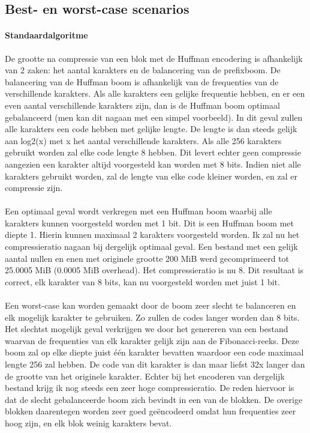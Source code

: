 \documentclass[11pt, a4paper]{article}
\begin{document}
\subsection{Best- en worst-case scenarios}
\paragraph{Standaardalgoritme}
De grootte na compressie van een blok met de Huffman encodering is afhankelijk van 2 zaken: het aantal karakters en de balancering van de prefixboom. De balancering van de Huffman boom is afhankelijk van de frequenties van de verschillende karakters. Als alle karakters een gelijke frequentie hebben, en er een even aantal verschillende karakters zijn, dan is de Huffman boom optimaal gebalanceerd (men kan dit nagaan met een simpel voorbeeld). In dit geval zullen alle karakters een code hebben met gelijke lengte. De lengte is dan steeds gelijk aan log2(x) met x het aantal verschillende karakters. Als alle 256 karakters gebruikt worden zal elke code lengte 8 hebben. Dit levert echter geen compressie aangezien een karakter altijd voorgesteld kan worden met 8 bits. Indien niet alle karakters gebruikt worden, zal de lengte van elke code kleiner worden, en zal er compressie zijn.
\\\\Een optimaal geval wordt verkregen met een Huffman boom waarbij alle karakters kunnen voorgesteld worden met 1 bit. Dit is een Huffman boom met diepte 1. Hierin kunnen maximaal 2 karakters voorgesteld worden. Ik zal nu het compressieratio nagaan bij dergelijk optimaal geval. Een bestand met een gelijk aantal nullen en enen met originele grootte 200 MiB werd gecomprimeerd tot 25.0005 MiB (0.0005 MiB overhead). Het compressieratio is nu 8. Dit resultaat is correct, elk karakter van 8 bits, kan nu voorgesteld worden met juist 1 bit. 
\\\\Een worst-case kan worden gemaakt door de boom zeer slecht te balanceren en elk mogelijk karakter te gebruiken. Zo zullen de codes langer worden dan 8 bits. Het slechtst mogelijk geval verkrijgen we door het genereren van een bestand waarvan de frequenties van elk karakter gelijk zijn aan de Fibonacci-reeks. Deze boom zal op elke diepte juist \'{e}\'{e}n karakter bevatten waardoor een code maximaal lengte 256 zal hebben. De code van dit karakter is dan maar liefst 32x langer dan de grootte van het originele karakter. Echter bij het encoderen van dergelijk bestand krijg ik nog steeds een zeer hoge compressieratio. De reden hiervoor is dat de slecht gebalanceerde boom zich bevindt in een van de blokken. De overige blokken daarentegen worden zeer goed ge\"{e}ncodeerd omdat hun frequenties zeer hoog zijn, en elk blok weinig karakters bevat. 
\end{document}
